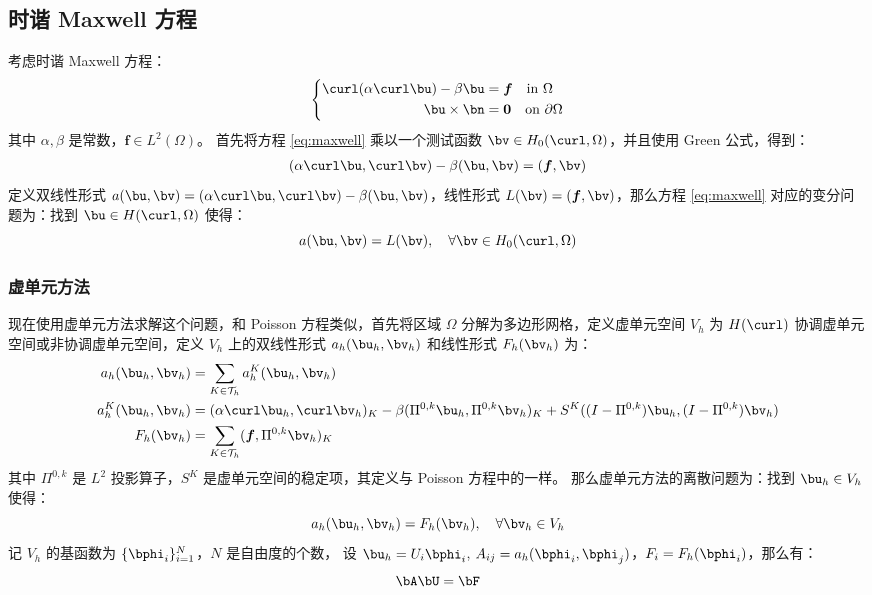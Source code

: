 \subsection{时谐 Maxwell 方程}
考虑时谐 Maxwell 方程：
\begin{equation}
    \label{eq:maxwell}
    \left\{
    \begin{aligned}
        \curl (\alpha\curl \bu) - \beta \bu & = \boldsymbol{f} \quad \text{in} \ \Omega\\
        \bu \times \bn & = \boldsymbol{0} \quad \text{on} \ \partial \Omega
    \end{aligned}
\right.
\end{equation}
其中 $\alpha, \beta$ 是常数，$\boldsymbol{f} \in L^2(\Omega)$。
首先将方程 \eqref{eq:maxwell} 乘以一个测试函数 $\bv \in H_0(\curl,
\Omega)$，并且使用 Green 公式，得到：
$$
\begin{aligned}
    (\alpha\curl \bu, \curl \bv) - \beta(\bu, \bv) & = (\boldsymbol{f}, \bv)\\
\end{aligned}
$$
定义双线性形式 $a(\bu, \bv) = (\alpha\curl \bu, \curl \bv) -
\beta(\bu, \bv)$，线性形式 $L(\bv) = (\boldsymbol{f}, \bv)$，那么方程
\eqref{eq:maxwell} 对应的变分问题为：找到 $\bu \in H(\curl, \Omega)$ 使得：
$$
a(\bu, \bv) = L(\bv), \quad \forall \bv \in H_0(\curl, \Omega)
$$
\subsubsection{虚单元方法}
现在使用虚单元方法求解这个问题，和 Poisson 方程类似，首先将区域 $\Omega$
分解为多边形网格，定义虚单元空间 $V_h$ 为 $H(\curl)$
协调虚单元空间或非协调虚单元空间，定义 $V_h$ 上的双线性形式 $a_h(\bu_h, \bv_h)$
和线性形式 $F_h(\bv_h)$ 为：
$$
\begin{aligned}
    a_h(\bu_h, \bv_h) & = \sum_{K \in \mathcal{T}_h}a_h^K(\bu_h, \bv_h)\\
    a_h^K(\bu_h, \bv_h) & = (\alpha\curl \bu_h, \curl
    \bv_h)_K - \beta(\Pi^{0, k}\bu_h, \Pi^{0, k}\bv_h)_K 
    + S^K((I - \Pi^{0, k})\bu_h, (I - \Pi^{0, k})\bv_h)\\
    F_h(\bv_h) & = \sum_{K\in \mathcal{T}_h}(\boldsymbol{f}, \Pi^{0, k}\bv_h)_K
\end{aligned}
$$
其中 $\Pi^{0, k}$ 是 $L^2$ 投影算子，$S^K$
是虚单元空间的稳定项，其定义与 Poisson 方程中的一样。
那么虚单元方法的离散问题为：找到 $\bu_h \in V_h$ 使得：
$$
a_h(\bu_h, \bv_h) = F_h(\bv_h), \quad \forall \bv_h \in V_h
$$
记 $V_h$ 的基函数为 $\{\bphi_i\}_{i=1}^{N}$，$N$ 是自由度的个数，
设 $\bu_h = U_i \bphi_i$, $A_{ij} = a_h(\bphi_i, \bphi_j)$，$F_i =
F_h(\bphi_i)$，那么有：
$$
\bA \bU = \bF
$$
